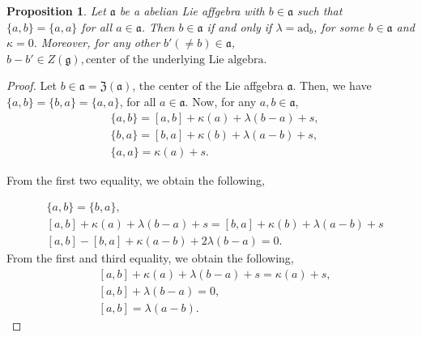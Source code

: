 \documentclass{article}
\newtheorem{corollary}{Corollary}[theorem]
\newtheorem{proposition}[theorem]{Proposition}
\theoremstyle{definition}
\theoremstyle{remark}
\theoremstyle{plain}
\begin{document}
\begin{proposition}
   Let $\mathfrak{a}$ be a abelian Lie affgebra with $b\in \mathfrak{a}$ such that $\{a, b\}=\{a, a\}$ for all $a\in \mathfrak{a}$. Then $b\in \mathfrak{a}$ if and only if $\lambda=\text{ad}_b$, for some $b\in \mathfrak{a}$ and $\kappa=0.$ Moreover, for any other $b'(\neq b)\in \mathfrak{a}$, $b-b'\in Z(\mathfrak{g}), \text{center of the underlying Lie algebra}.$
\end{proposition}
\begin{proof}
    Let $b\in \mathfrak{a} = \mathfrak{Z(a)}$, the center of the Lie affgebra $\mathfrak{a}$. Then, we have $\{a, b\}=\{b,a\}=\{a, a\}$, for all $a\in \mathfrak{a}$. Now, for any $a, b\in \mathfrak{a}$,
    \begin{align*}
        &\{a,b\}=[a, b]+\kappa(a)+\lambda(b-a)+s,\\
         &\{b,a\}=[b, a]+\kappa(b)+\lambda(a-b)+s,\\
         &\{a,a\}=\kappa(a)+s.
    \end{align*}
    
From the first two equality, we obtain the following,

\begin{align}
&\{a, b\}=\{b,a\},\nonumber\\
&[a, b]+\kappa(a)+\lambda(b-a)+s=[b, a]+\kappa(b)+\lambda(a-b)+s\nonumber\\
&[a, b]-[b,a]+\kappa(a-b)+2\lambda(b-a)=0.
\end{align}
From the first and third equality, we obtain the following,
\begin{align}
&[a, b]+\kappa(a)+\lambda(b-a)+s=\kappa(a)+s,\nonumber\\
&[a, b]+\lambda(b-a)=0,\nonumber\\ \label{equ13}
&[a, b]=\lambda(a-b).
\end{align}


\end{proof}
\end{document}
